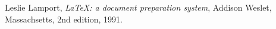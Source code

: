 % 
% 
% 
% 
% 
% 
% 
% 
% 
% 
% 
% 
% 
% 

\begin{thebibliography}

  Leslie Lamport,
  \emph{\LaTeX: a document preparation system},
  Addison Weslet, Massachsetts,
  2nd edition,
  1991.

\end{thebibliography}
